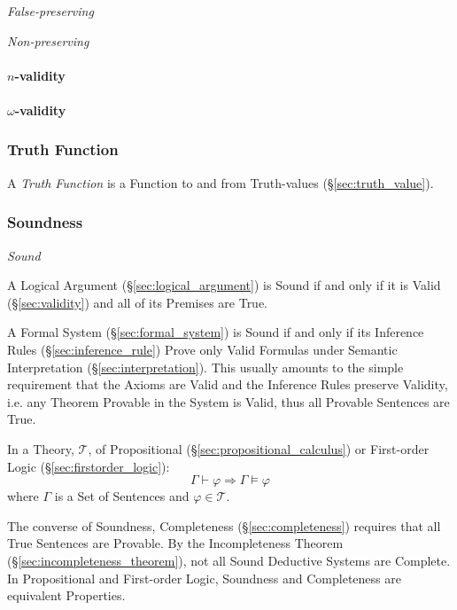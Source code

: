 \emph{False-preserving}

\emph{Non-preserving}



\paragraph{$n$-validity}\label{sec:n_validity}

\paragraph{$\omega$-validity}\label{sec:omega_validity}



\subsubsection{Truth Function}\label{sec:truth_function}

A \emph{Truth Function} is a Function to and from Truth-values
(\S\ref{sec:truth_value}).



\subsubsection{Soundness}\label{sec:soundness}

\emph{Sound}

A Logical Argument (\S\ref{sec:logical_argument}) is Sound if and only
if it is Valid (\S\ref{sec:validity}) and all of its Premises are
True.

A Formal System (\S\ref{sec:formal_system}) is Sound if and only if
its Inference Rules (\S\ref{sec:inference_rule}) Prove only Valid
Formulas under Semantic Interpretation (\S\ref{sec:interpretation}).
This usually amounts to the simple requirement that the Axioms are
Valid and the Inference Rules preserve Validity, i.e. any Theorem
Provable in the System is Valid, thus all Provable Sentences are True.

In a Theory, $\mathcal{T}$, of Propositional
(\S\ref{sec:propositional_calculus}) or First-order Logic
(\S\ref{sec:firstorder_logic}):
\[
  \Gamma \vdash \varphi \Rightarrow \Gamma \vDash \varphi
\]
where $\Gamma$ is a Set of Sentences and $\varphi \in \mathcal{T}$.

The converse of Soundness, Completeness (\S\ref{sec:completeness})
requires that all True Sentences are Provable. By the Incompleteness
Theorem (\S\ref{sec:incompleteness_theorem}), not all Sound Deductive
Systems are Complete. In Propositional and First-order Logic,
Soundness and Completeness are equivalent Properties.


